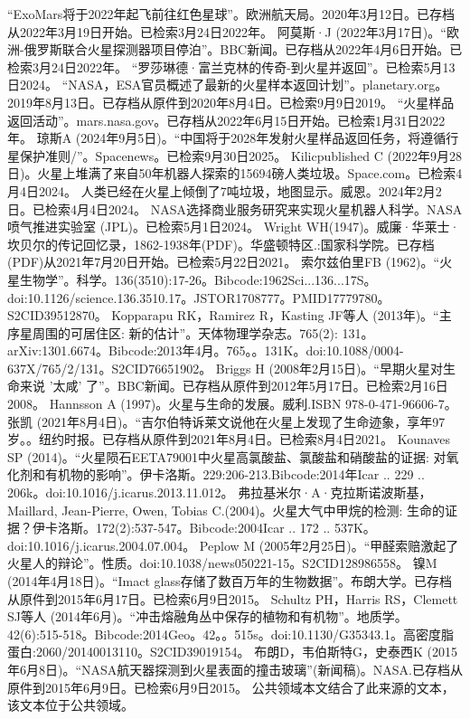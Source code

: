 \begin{enumerate}
 “ExoMars将于2022年起飞前往红色星球”。欧洲航天局。2020年3月12日。已存档从2022年3月19日开始。已检索3月24日2022年。
 阿莫斯·J (2022年3月17日)。“欧洲-俄罗斯联合火星探测器项目停泊”。BBC新闻。已存档从2022年4月6日开始。已检索3月24日2022年。
 “罗莎琳德·富兰克林的传奇-到火星并返回”。已检索5月13日2024。
 “NASA，ESA官员概述了最新的火星样本返回计划”。planetary.org。2019年8月13日。已存档从原件到2020年8月4日。已检索9月9日2019。
 “火星样品返回活动”。mars.nasa.gov。已存档从2022年6月15日开始。已检索1月31日2022年。
 琼斯A (2024年9月5日)。“中国将于2028年发射火星样品返回任务，将遵循行星保护准则/”。Spacenews。已检索9月30日2025。
 Kilicpublished C (2022年9月28日)。火星上堆满了来自50年机器人探索的15694磅人类垃圾。Space.com。已检索4月4日2024。
 人类已经在火星上倾倒了7吨垃圾，地图显示。威恩。2024年2月2日。已检索4月4日2024。
 NASA选择商业服务研究来实现火星机器人科学。NASA喷气推进实验室 (JPL)。已检索5月1日2024。
 Wright WH(1947)。威廉·华莱士·坎贝尔的传记回忆录，1862-1938年(PDF)。华盛顿特区.:国家科学院。已存档(PDF)从2021年7月20日开始。已检索5月22日2021。
 索尔兹伯里FB (1962)。“火星生物学”。科学。136(3510):17-26。Bibcode:1962Sci...136...17S。doi:10.1126/science.136.3510.17。JSTOR1708777。PMID17779780。S2CID39512870。   
 Kopparapu RK，Ramirez R，Kasting JF等人 (2013年)。“主序星周围的可居住区: 新的估计”。天体物理学杂志。765(2): 131。arXiv:1301.6674。Bibcode:2013年4月。765。。131K。doi:10.1088/0004-637X/765/2/131。S2CID76651902。 
 Briggs H (2008年2月15日)。“早期火星对生命来说 '太咸' 了”。BBC新闻。已存档从原件到2012年5月17日。已检索2月16日2008。
 Hannsson A (1997)。火星与生命的发展。威利.ISBN 978-0-471-96606-7。
 张凯 (2021年8月4日)。“吉尔伯特诉莱文说他在火星上发现了生命迹象，享年97岁。。纽约时报。已存档从原件到2021年8月4日。已检索8月4日2021。
 Kounaves SP (2014)。“火星陨石EETA79001中火星高氯酸盐、氯酸盐和硝酸盐的证据: 对氧化剂和有机物的影响”。伊卡洛斯。229:206-213.Bibcode:2014年Icar .. 229 .. 206k。doi:10.1016/j.icarus.2013.11.012。
 弗拉基米尔·A·克拉斯诺波斯基，Maillard, Jean-Pierre, Owen, Tobias C.(2004)。火星大气中甲烷的检测: 生命的证据？伊卡洛斯。172(2):537-547。Bibcode:2004Icar .. 172 .. 537K。doi:10.1016/j.icarus.2004.07.004。
 Peplow M (2005年2月25日)。“甲醛索赔激起了火星人的辩论”。性质。doi:10.1038/news050221-15。S2CID128986558。 
 镍M (2014年4月18日)。“Imact glass存储了数百万年的生物数据”。布朗大学。已存档从原件到2015年6月17日。已检索6月9日2015。
 Schultz PH，Harris RS，Clemett SJ等人 (2014年6月)。“冲击熔融角丛中保存的植物和有机物”。地质学。42(6):515-518。Bibcode:2014Geo。42。。515s。doi:10.1130/G35343.1。高密度脂蛋白:2060/20140013110。S2CID39019154。 
 布朗D，韦伯斯特G，史泰西K (2015年6月8日)。“NASA航天器探测到火星表面的撞击玻璃”(新闻稿)。NASA.已存档从原件到2015年6月9日。已检索6月9日2015。 公共领域本文结合了此来源的文本，该文本位于公共领域。

\end{enumerate}
